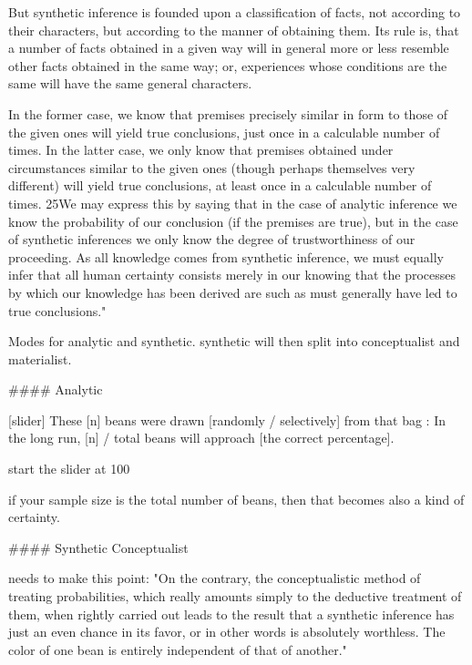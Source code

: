 But synthetic inference is founded upon a classification of facts, not according to their characters, but according to the manner of obtaining them. Its rule is, that a number of facts obtained in a given way will in general more or less resemble other facts obtained in the same way; or, experiences whose conditions are the same will have the same general characters.

In the former case, we know that premises precisely similar in form to those of the given ones will yield true conclusions, just once in a calculable number of times. In the latter case, we only know that premises obtained under circumstances similar to the given ones (though perhaps themselves very different) will yield true conclusions, at least once in a calculable number of times. 25We may express this by saying that in the case of analytic inference we know the probability of our conclusion (if the premises are true), but in the case of synthetic inferences we only know the degree of trustworthiness of our proceeding. As all knowledge comes from synthetic inference, we must equally infer that all human certainty consists merely in our knowing that the processes by which our knowledge has been derived are such as must generally have led to true conclusions."


Modes for analytic and synthetic. synthetic will then split into conceptualist and materialist.

#### Analytic

[slider] %
These [n] beans were drawn [randomly / selectively] from that bag
:  In the long run, [n] / total beans will approach [the correct percentage].

start the slider at 100%

if your sample size is the total number of beans, then that becomes also a kind of certainty.

#### Synthetic Conceptualist

needs to make this point: "On the contrary, the conceptualistic method of treating probabilities, which really amounts simply to the deductive treatment of them, when rightly carried out leads to the result that a synthetic inference has just an even chance in its favor, or in other words is absolutely worthless. The color of one bean is entirely independent of that of another."

